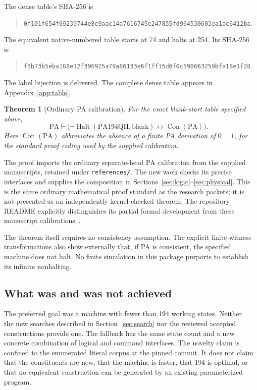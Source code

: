 \documentclass[11pt,letterpaper]{article}
\newtheorem{theorem}{Theorem}[section]
\newcommand{\PA}{\mathrm{PA}}
\newcommand{\Con}{\operatorname{Con}}
\newcommand{\Halt}{\operatorname{Halt}}
\newcommand{\file}[1]{\texttt{\nolinkurl{#1}}}
\newcommand{\candidate}{\mathrm{PA194QH}}
\begin{document}
The dense table's SHA-256 is
\begin{quote}\small\nolinkurl{0f101f654f69230744e8c9aac14a7616745e247855fd964530603ea1ac6412ba}.\end{quote}
The equivalent native-numbered table starts at 74 and halts at 254. Its
SHA-256 is
\begin{quote}\small\nolinkurl{f3b73b5eba188e12f396925a79a86133e6f1ff15d6f0c590663259bfa18e1f28}.\end{quote}
The label bijection is delivered. The complete dense table appears in
Appendix~\ref{app:table}.

\begin{theorem}[Ordinary PA calibration]
\label{thm:main}
For the exact blank-start table specified above,
\[
 \PA\vdash
 \bigl(\neg\Halt(\candidate,\mathrm{blank})\leftrightarrow\Con(\PA)\bigr).
\]
Here $\Con(\PA)$ abbreviates the absence of a finite PA derivation of
$0=1$, for the standard proof coding used by the supplied calibration.
\end{theorem}

The proof imports the ordinary separate-head PA calibration from the
supplied manuscripts, retained under \file{references/}. The new work
checks its precise interfaces and supplies the composition in
Sections~\ref{sec:logic}--\ref{sec:physical}. This is the same ordinary
mathematical proof standard as the research packets; it is not presented
as an independently kernel-checked theorem. The repository README
explicitly distinguishes its partial formal development from these
manuscript calibrations~\cite{pa-status}.

The theorem itself requires no consistency assumption. The explicit
finite-witness transformations also show externally that, if PA is
consistent, the specified machine does not halt. No finite simulation in
this package purports to establish its infinite nonhalting.

\subsection{What was and was not achieved}
The preferred goal was a machine with fewer than 194 working states.
Neither the new searches described in Section~\ref{sec:search} nor the
reviewed accepted constructions provide one. The fallback has the same
state count and a new concrete combination of logical and command
interfaces. The novelty claim is confined to the enumerated literal
corpus at the pinned commit. It does not claim that the constituents are
new, that the machine is faster, that 194 is optimal, or that no equivalent
construction can be generated by an existing parameterized program.
\end{document}
